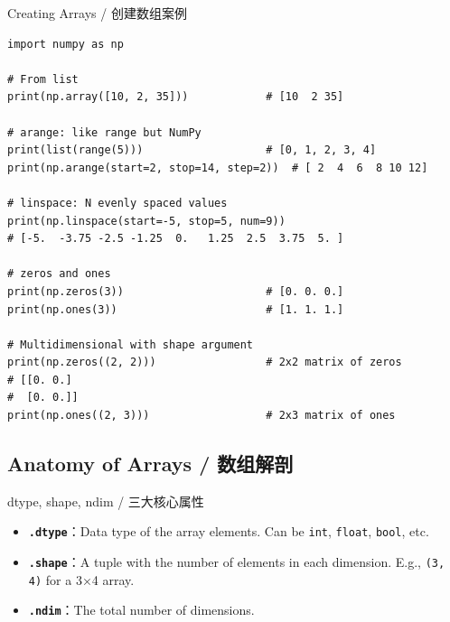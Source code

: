 \documentclass[11pt,a4paper]{article}
\begin{document}
\begin{examplebox}{Creating Arrays / 创建数组案例}
\begin{lstlisting}
import numpy as np

# From list
print(np.array([10, 2, 35]))            # [10  2 35]

# arange: like range but NumPy
print(list(range(5)))                   # [0, 1, 2, 3, 4]
print(np.arange(start=2, stop=14, step=2))  # [ 2  4  6  8 10 12]

# linspace: N evenly spaced values
print(np.linspace(start=-5, stop=5, num=9))
# [-5.  -3.75 -2.5 -1.25  0.   1.25  2.5  3.75  5. ]

# zeros and ones
print(np.zeros(3))                      # [0. 0. 0.]
print(np.ones(3))                       # [1. 1. 1.]

# Multidimensional with shape argument
print(np.zeros((2, 2)))                 # 2x2 matrix of zeros
# [[0. 0.]
#  [0. 0.]]
print(np.ones((2, 3)))                  # 2x3 matrix of ones
\end{lstlisting}
\end{examplebox}

\subsection{Anatomy of Arrays / 数组解剖}

\begin{concept}{dtype, shape, ndim / 三大核心属性}
    \begin{itemize}[itemsep=0.5em]
        \item \textbf{\texttt{.dtype}}：Data type of the array elements. Can be \texttt{int}, \texttt{float}, \texttt{bool}, etc.
        \item \textbf{\texttt{.shape}}：A tuple with the number of elements in each dimension. E.g., \texttt{(3, 4)} for a 3×4 array.
        \item \textbf{\texttt{.ndim}}：The total number of dimensions.
    \end{itemize}
\end{concept}
\end{document}
